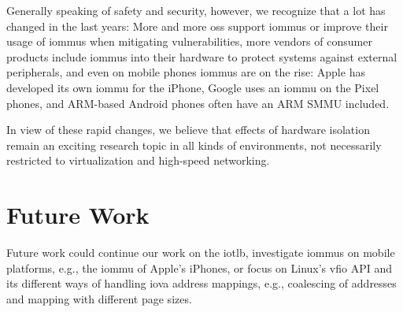 Generally speaking of safety and security, however, we recognize that a lot has
changed in the last years: More and more \acp{os} support \acp{iommu} or improve
their usage of \acp{iommu} when mitigating vulnerabilities, more vendors of
consumer products include \acp{iommu} into their hardware to protect systems
against external peripherals, and even on mobile phones \acp{iommu} are on the
rise: Apple has developed its own \ac{iommu} for the iPhone, Google uses an
\ac{iommu} on the Pixel phones, and ARM-based Android phones often have an ARM
SMMU included.

In view of these rapid changes, we believe that effects of hardware isolation
remain an exciting research topic in all kinds of environments, not necessarily
restricted to virtualization and high-speed networking.


\section{Future Work}
\label{chap:future_work}

Future work could continue our work on the \ac{iotlb}, investigate \acp{iommu}
on mobile platforms, e.g., the \ac{iommu} of Apple's iPhones, or focus on
Linux's \ac{vfio} API and its different ways of handling \ac{iova} address
mappings, e.g., coalescing of addresses and mapping with different page sizes.

